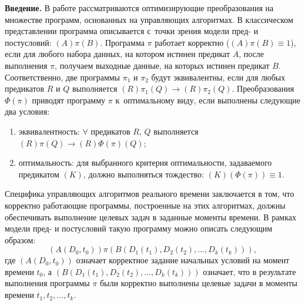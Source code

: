 


\date{15/I/2009} %



\maketitle

\textbf{Введение.} В работе рассматриваются оптимизирующие преобразования на
множестве программ,  основанных на управляющих алгоритмах.
В классическом представлении программа описывается с~точки зрения модели
пред- и постусловий: $(A)\pi(B)$.
Программа $\pi $ работает корректно ($(A)\pi (B)\equiv 1$),  если для любого набора данных,
на котором истинен предикат $A$,  после выполнения $\pi $,  получаем выходные данные,
на которых истинен предикат $B$.
Соответственно,  две программы $\pi _1 $ и $\pi _2 $ будут
эквивалентны,  если для любых предикатов $R$ и $Q$ выполняется
$(R)\pi _1 (Q)\to  (R)\pi _2 (Q)$.
Преобразования $\Phi(\pi )$ приводят программу $\pi $ к~оптимальному виду,
если выполнены следующие два условия:
\begin{enumerate}
\item эквивалентность: $\forall $ предикатов $R$,  $Q$ выполняется $(R)\pi (Q){\to } (R)\Phi(\pi )(Q)$;
\item оптимальность: для выбранного критерия оптимальности,  задаваемого предикатом $(K)$,
должно выполняться тождество: $(K)(\Phi(\pi ))\equiv 1$.
\end{enumerate}

Специфика управляющих алгоритмов реального времени заключается в том,
что корректно работающие программы,  построенные на этих алгоритмах, должны
обеспечивать выполнение целевых задач в заданные моменты времени.
В рамках модели пред- и постусловий такую программу можно описать следующим образом:
$$(A(D_0 , t_0 ))\pi (B(D_1 (t_1 ), D_2 (t_2 ), \dots, D_k (t_k ))), $$
где $(A(D_0, t_0 ))$ означает корректное задание начальных условий на момент времени
$t_0 $,
а $(B(D_1 (t_1 ), D_2 (t_2 ), \dots, D_k (t_k )))$ означает,  что в
результате выполнения программы $\pi $ были корректно выполнены целевые
задачи в моменты времени $t_1 , t_2 ,  \dots, t_k $.

